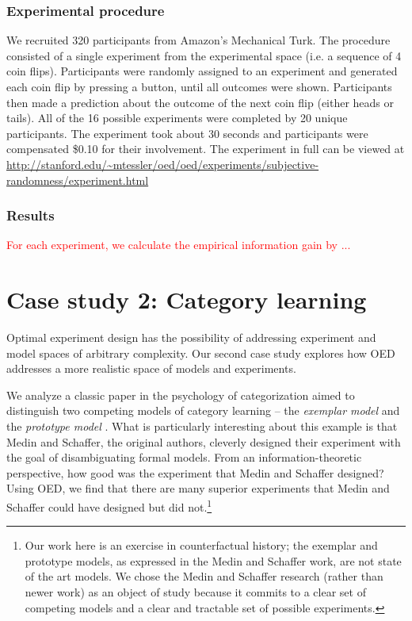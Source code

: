\documentclass{article}
\newcommand{\red}[1]{\textcolor{Red}{#1}}
\begin{document}
\subsubsection{Experimental procedure}

We recruited 320 participants from Amazon's Mechanical Turk. The procedure consisted of a single experiment from the experimental space (i.e. a sequence of 4 coin flips). Participants were randomly assigned to an experiment and generated each coin flip by pressing a button, until all outcomes were shown. Participants then made a prediction about the outcome of the next coin flip (either heads or tails). All of the 16 possible experiments were completed by 20 unique participants. The experiment took about 30 seconds and participants were compensated \$0.10 for their involvement. The experiment in full can be viewed at \url{http://stanford.edu/~mtessler/oed/oed/experiments/subjective-randomness/experiment.html}

\subsubsection{Results}

\red{For each experiment, we calculate the empirical information gain by ...}



\section{Case study 2: Category learning}

Optimal experiment design has the possibility of addressing experiment and model spaces of arbitrary complexity. Our second case study explores how OED addresses a more realistic space of models and experiments.

We analyze a classic paper in the psychology of categorization aimed to distinguish two competing models of category learning -- the \emph{exemplar model} and the \emph{prototype model} \cite{medin78:pr}. What is particularly interesting about this example is that Medin and Schaffer, the original authors, cleverly designed their experiment with the goal of disambiguating formal models.
From an information-theoretic perspective, how good was the experiment that Medin and Schaffer designed?
Using OED, we find that there are many superior experiments that Medin and Schaffer could have designed but did not.\footnote{Our work here is an exercise in counterfactual history; the exemplar and prototype models, as expressed in the Medin and Schaffer work, are not state of the art models. We chose the Medin and Schaffer research (rather than newer work) as an object of study because it commits to a clear set of competing models and a clear and tractable set of possible experiments.}
\end{document}
